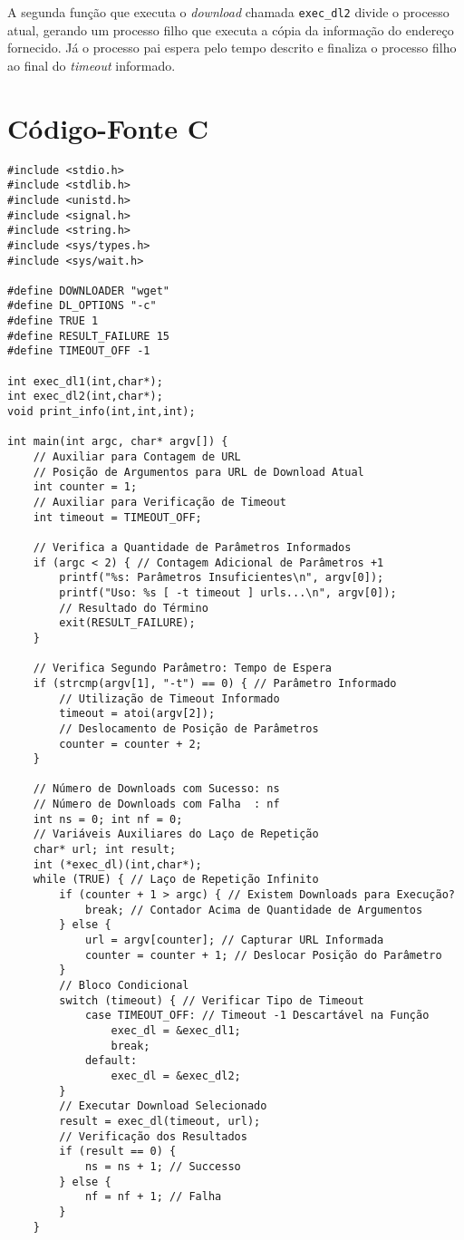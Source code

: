 \documentclass{article}
\begin{document}
A segunda função que executa o \textit{download} chamada \texttt{exec\_dl2}
divide o processo atual, gerando um processo filho que executa a cópia da
informação do endereço fornecido. Já o processo pai espera pelo tempo descrito e
finaliza o processo filho ao final do \textit{timeout} informado.

\section{Código-Fonte C}

\begin{small}
\begin{verbatim}
#include <stdio.h>
#include <stdlib.h>
#include <unistd.h>
#include <signal.h>
#include <string.h>
#include <sys/types.h>
#include <sys/wait.h>

#define DOWNLOADER "wget"
#define DL_OPTIONS "-c"
#define TRUE 1
#define RESULT_FAILURE 15
#define TIMEOUT_OFF -1

int exec_dl1(int,char*);
int exec_dl2(int,char*);
void print_info(int,int,int);

int main(int argc, char* argv[]) {
    // Auxiliar para Contagem de URL
    // Posição de Argumentos para URL de Download Atual
    int counter = 1;
    // Auxiliar para Verificação de Timeout
    int timeout = TIMEOUT_OFF;

    // Verifica a Quantidade de Parâmetros Informados
    if (argc < 2) { // Contagem Adicional de Parâmetros +1
        printf("%s: Parâmetros Insuficientes\n", argv[0]);
        printf("Uso: %s [ -t timeout ] urls...\n", argv[0]);
        // Resultado do Término
        exit(RESULT_FAILURE);
    }

    // Verifica Segundo Parâmetro: Tempo de Espera
    if (strcmp(argv[1], "-t") == 0) { // Parâmetro Informado
        // Utilização de Timeout Informado
        timeout = atoi(argv[2]);
        // Deslocamento de Posição de Parâmetros
        counter = counter + 2;
    }

    // Número de Downloads com Sucesso: ns
    // Número de Downloads com Falha  : nf
    int ns = 0; int nf = 0;
    // Variáveis Auxiliares do Laço de Repetição
    char* url; int result;
    int (*exec_dl)(int,char*);
    while (TRUE) { // Laço de Repetição Infinito
        if (counter + 1 > argc) { // Existem Downloads para Execução?
            break; // Contador Acima de Quantidade de Argumentos
        } else {
            url = argv[counter]; // Capturar URL Informada
            counter = counter + 1; // Deslocar Posição do Parâmetro
        }
        // Bloco Condicional
        switch (timeout) { // Verificar Tipo de Timeout
            case TIMEOUT_OFF: // Timeout -1 Descartável na Função
                exec_dl = &exec_dl1;
                break;
            default:
                exec_dl = &exec_dl2;
        }
        // Executar Download Selecionado
        result = exec_dl(timeout, url);
        // Verificação dos Resultados
        if (result == 0) {
            ns = ns + 1; // Successo
        } else {
            nf = nf + 1; // Falha
        }
    }


\end{verbatim}
\end{small}
\end{document}
